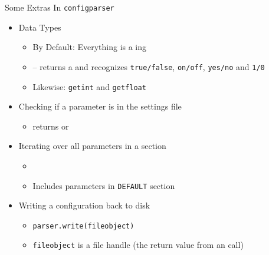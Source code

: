 
\begin{frame}{Some Extras In \texttt{configparser}}
%
\begin{itemize}
\item Data Types
	\begin{itemize}
	\item By Default: Everything is a ing
	\item {} -- returns a  and recognizes \texttt{true/false}, \texttt{on/off}, \texttt{yes/no} and \texttt{1/0}
	\item Likewise: \texttt{getint} and \texttt{getfloat}
	\end{itemize}
\item Checking if a parameter is in the settings file
	\begin{itemize}
	\item {} returns  or 
	\end{itemize}
\item Iterating over all parameters in a section
	\begin{itemize}
	\item {}
	\item Includes parameters in \texttt{DEFAULT} section
	\end{itemize}
\item Writing a configuration back to disk
	\begin{itemize}
	\item \texttt{parser.write(fileobject)}
	\item \texttt{fileobject} is a file handle (the return value from an  call)
	\end{itemize}
\end{itemize}
%
\end{frame}


